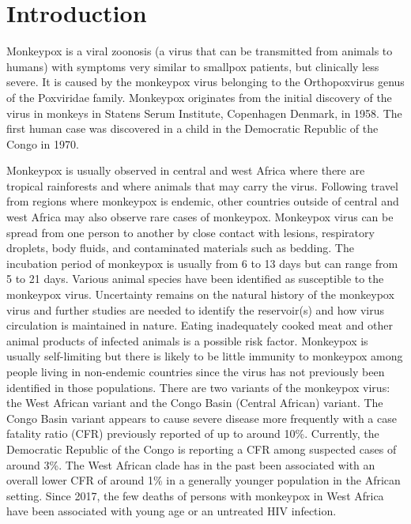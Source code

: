 \chapter{Introduction}
Monkeypox is a viral zoonosis (a virus that can be transmitted from animals to humans) with symptoms very similar to smallpox patients, but clinically less severe. It is caused by the monkeypox virus belonging to the Orthopoxvirus genus of the Poxviridae family. Monkeypox originates from the initial discovery of the virus in monkeys in Statens Serum Institute, Copenhagen Denmark, in 1958. The first human case was discovered in a child in the Democratic Republic of the Congo in 1970.

Monkeypox is usually observed in central and west Africa where there are tropical rainforests and where animals that may carry the virus. Following travel from regions where monkeypox is endemic, other countries outside of central and west Africa may also observe rare cases of monkeypox.
Monkeypox virus can be spread from one person to another by close contact with lesions, respiratory droplets, body fluids, and contaminated materials such as bedding. The incubation period of monkeypox is usually from 6 to 13 days but can range from 5 to 21 days.
Various animal species have been identified as susceptible to the monkeypox virus. Uncertainty remains on the natural history of the monkeypox virus and further studies are needed to identify the reservoir(s) and how virus circulation is maintained in nature. Eating inadequately cooked meat and other animal products of infected animals is a possible risk factor.
Monkeypox is usually self-limiting but there is likely to be little immunity to monkeypox among people living in non-endemic countries since the virus has not previously been identified in those populations. There are two variants of the monkeypox virus: the West African variant and the Congo Basin (Central African) variant. The Congo Basin variant appears to cause severe disease more frequently with a case fatality ratio (CFR) previously reported of up to around 10\%. Currently, the Democratic Republic of the Congo is reporting a CFR among suspected cases of around 3\%. The West African clade has in the past been associated with an overall lower CFR of around 1\% in a generally younger population in the African setting. Since 2017, the few deaths of persons with monkeypox in West Africa have been associated with young age or an untreated HIV infection.

